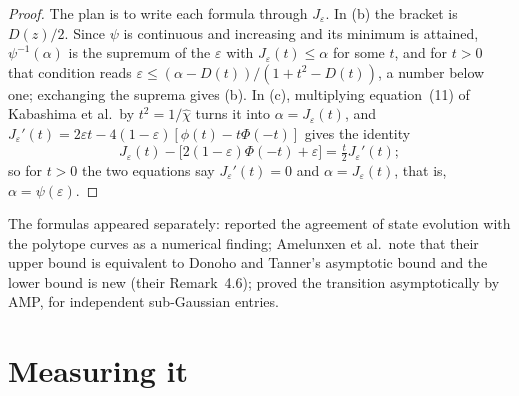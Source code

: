 \begin{refsection}

\begin{proof}
The plan is to write each formula through $J_\varepsilon$. In (b) the bracket is $D(z)/2$. Since $\psi$ is continuous and increasing and its minimum is attained, $\psi^{-1}(\alpha)$ is the supremum of the $\varepsilon$ with $J_\varepsilon(t)\le\alpha$ for some $t$, and for $t>0$ that condition reads $\varepsilon\le(\alpha-D(t))/(1+t^2-D(t))$, a number below one; exchanging the suprema gives (b). In (c), multiplying equation~(11) of Kabashima et al.\ by $t^2=1/\hat\chi$ turns it into $\alpha=J_\varepsilon(t)$, and $J_\varepsilon'(t)=2\varepsilon t-4(1-\varepsilon)[\phi(t)-t\Phi(-t)]$ gives the identity
\[
J_\varepsilon(t)-\bigl[2(1-\varepsilon)\Phi(-t)+\varepsilon\bigr]=\tfrac t2J_\varepsilon'(t);
\]
so for $t>0$ the two equations say $J_\varepsilon'(t)=0$ and $\alpha=J_\varepsilon(t)$, that is, $\alpha=\psi(\varepsilon)$.
\end{proof}

The formulas appeared separately: \textcite{DonohoMalekiMontanari2009} reported the agreement of state evolution with the polytope curves as a numerical finding; Amelunxen et al.\ note that their upper bound is equivalent to Donoho and Tanner's asymptotic bound and the lower bound is new (their Remark~4.6); \textcite{BayatiLelargeMontanari2015} proved the transition asymptotically by AMP, for independent sub-Gaussian entries.

\section{Measuring it}\label{sec:lasso:measuring}


\end{refsection}
